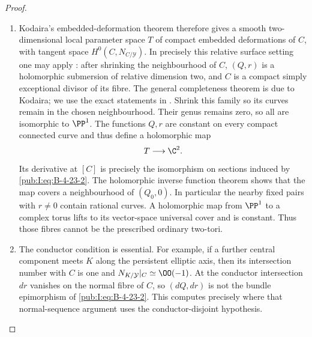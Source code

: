 \begin{proof}
\begin{enumerate}[label=\arabic*.,leftmargin=*]
\item Kodaira's embedded-deformation theorem therefore gives a
smooth two-dimensional local parameter space $T$ of
compact embedded deformations of $C$, with tangent space
$H^0(C,N_{C/\mathcal Y})$. In precisely this relative
surface setting one may apply \citet[arXiv version~2, Proposition~2.3 and its proof, PDF pp.~6--7]{DlousskyTeleman2012AB}: after shrinking
the neighbourhood of $C$, $(Q,r)$ is a holomorphic
submersion of relative dimension two, and $C$ is a
compact simply exceptional divisor of its fibre.
The general completeness theorem is due to Kodaira; we use the exact statements in \citet[Section~1, p.~71, and Section~3.1, p.~74]{Merkulov1995D}.
Shrink this family so its curves
remain in the chosen neighbourhood. Their genus remains
zero, so all are isomorphic to $\PP^1$.
The functions $Q,r$ are constant on every compact
connected curve and thus define a holomorphic map
\[
 T\longrightarrow\C^2.
\]
Its derivative at $[C]$ is precisely the isomorphism on
sections induced by \eqref{pub:I:eq:B-4-23-2}. The holomorphic inverse
function theorem shows that the map covers a neighbourhood
of $(Q_0,0)$. In particular the nearby fixed pairs with
$r\ne0$ contain rational curves. A holomorphic map from
$\PP^1$ to a complex torus lifts to its vector-space
universal cover and is constant. Thus those fibres cannot
be the prescribed ordinary two-tori.

\item The conductor condition is essential. For example, if a
further central component meets $K$ along the persistent
elliptic axis, then its intersection number with $C$ is
one and $N_{K/\mathcal Y}|_C\simeq\OO(-1)$.
At the conductor intersection $dr$ vanishes on the normal fibre
of $C$, so $(dQ,dr)$ is not the bundle epimorphism of
\eqref{pub:I:eq:B-4-23-2}. This computes precisely where that
normal-sequence argument uses the conductor-disjoint hypothesis.
\end{enumerate}
\end{proof}
